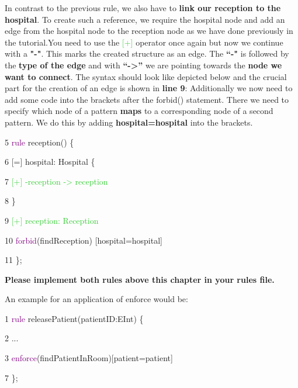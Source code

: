 In contrast to the previous rule, we also have to \textbf{link our reception to the hospital}. To create such a reference, we require the hospital node and add an edge from the hospital node to the reception node as we have done previously in the tutorial.\newline You need to use the \textcolor{LimeGreen}{[+]} operator once again but now we continue with a \textbf{"-"}. This marks the created structure as an edge. The \textbf{“-"} is followed by the \textbf{type of the edge} and with \textbf{“->”} we are pointing towards the \textbf{node we want to connect}.\newline
The syntax should look like depicted below and the crucial part for the creation of an edge is shown in \textbf{line 9}:\newline
Additionally we now need to add some code into the brackets after the forbid() statement. There we need to specify which node of a pattern \textbf{maps} to a corresponding node of a second pattern. We do this by adding \textbf{hospital=hospital} into the brackets.\newline

{

5 \hspace{0.5cm}\textcolor{Purple}{rule} reception() \{

6 \hspace{1cm}    [=] hospital: Hospital \{

7 \hspace{1.5cm}       \textcolor{LimeGreen}{[+] -reception -> reception}

8 \hspace{1.5cm}	 \}

9 \hspace{1cm}	 \textcolor{LimeGreen}{[+] reception: Reception}

10 \hspace{1cm}\textcolor{Purple}{forbid}(findReception) [hospital=hospital] 

11 \hspace{0.5cm}\}; \newline

}

\textbf{Please implement both rules above this chapter in your rules file.}\newline

An example for an application of enforce would be:

{
	
	1 \hspace{0.5cm}\textcolor{Purple}{rule} releasePatient(patientID:EInt) \{
	
	2 \hspace{1cm}    ...
	
	3 \hspace{1cm}	\textcolor{Purple}{enforce}(findPatientInRoom)[patient=patient]
	
	7 \hspace{0.5cm}\}; \newline
	
}

